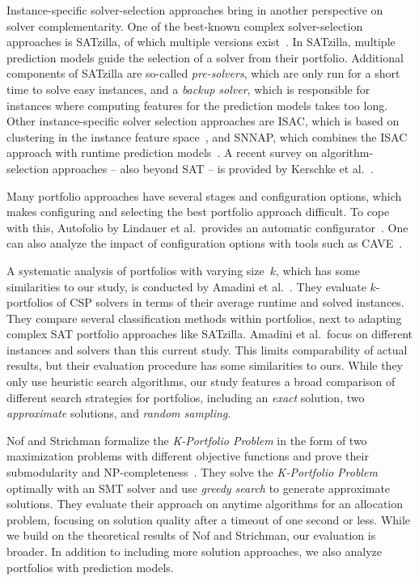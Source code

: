 \documentclass[a4paper,USenglish,pdfa]{lipics-v2021} %
\begin{document}
Instance-specific solver-selection approaches bring in another perspective on solver complementarity.
One of the best-known complex solver-selection approaches is SATzilla, of which multiple versions exist~\cite{xu2008satzilla,xu2012satzilla2012}. 
In SATzilla, multiple prediction models guide the selection of a solver from their portfolio. 
Additional components of SATzilla are so-called \emph{pre-solvers}, which are only run for a short time to solve easy instances, and a \emph{backup solver}, which is responsible for instances where computing features for the prediction models takes too long.
Other instance-specific solver selection approaches are ISAC, which is based on clustering in the instance feature space~\cite{Kadioglu:2010:ISAC}, and SNNAP, which combines the ISAC approach with runtime prediction models~\cite{Collautti:2013:SNNAP}.
A recent survey on algorithm-selection approaches -- also beyond SAT -- is provided by Kerschke et al.~\cite{kerschke2019automated}.

Many portfolio approaches have several stages and configuration options, which makes configuring and selecting the best portfolio approach difficult.
To cope with this, Autofolio by Lindauer et al.\ provides an automatic configurator~\cite{lindauer2015autofolio}.
One can also analyze the impact of configuration options with tools such as CAVE~\cite{biedenkapp2018cave}.

A systematic analysis of portfolios with varying size~$k$, which has some similarities to our study, is conducted by Amadini et al.~\cite{amadini2014empirical,amadini2016extensive}.
They evaluate $k$-portfolios of CSP solvers in terms of their average runtime and solved instances. 
They compare several classification methods within portfolios, next to adapting complex SAT portfolio approaches like SATzilla. 
Amadini et al.\ focus on different instances and solvers than this current study.
This limits comparability of actual results, but their evaluation procedure has some similarities to ours.
While they only use heuristic search algorithms, our study features a broad comparison of different search strategies for portfolios, including an \emph{exact} solution, two \emph{approximate} solutions, and \emph{random sampling}. 

Nof and Strichman formalize the \emph{K-Portfolio Problem} in the form of two maximization problems with different objective functions and prove their submodularity and NP-completeness~\cite{nof2020real}. 
They solve the \emph{K-Portfolio Problem} optimally with an SMT solver and use \emph{greedy search} to generate approximate solutions.
They evaluate their approach on anytime algorithms for an allocation problem, focusing on solution quality after a timeout of one second or less. 
While we build on the theoretical results of Nof and Strichman, our evaluation is broader. 
In addition to including more solution approaches, we also analyze portfolios with prediction models.
\end{document}
